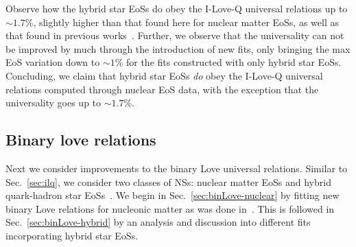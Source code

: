 \documentclass[prd,twocolumn,nofootinbib,superscriptaddress,amsmath,amssymb]{revtex4-1}
\begin{document}
Observe how the hybrid star EoSs do obey the I-Love-Q universal relations up to $\sim1.7$\%, slightly higher than that found here for nuclear matter EoSs, as well as that found in previous works~\cite{Yagi:ILQ}.
Further, we observe that the universality can not be improved by much through the introduction of new fits, only bringing the max EoS variation down to $\sim1$\% for the fits constructed with only hybrid star EoSs.
Concluding, we claim that hybrid star EoSs \emph{do} obey the I-Love-Q universal relations computed through nuclear EoS data, with the exception that the universality goes up to $\sim1.7$\%. 

\subsection{Binary love relations}\label{sec:binary}
Next we consider improvements to the binary Love universal relations.
Similar to Sec.~\ref{sec:ilq}, we consider two classes of NSs: nuclear matter EoSs and hybrid quark-hadron star EoSs~\cite{Paschalidis2018,Alford:2017qgh,1971SvA....15..347S,Zdunik:2012dj,Alford:2013aca}.
We begin in Sec.~\ref{sec:binLove-nuclear} by fitting new binary Love relations for nucleonic matter as was done in~\cite{Yagi:binLove}.
This is followed in Sec.~\ref{sec:binLove-hybrid} by an analysis and discussion into different fits incorporating hybrid star EoSs.
\end{document}
